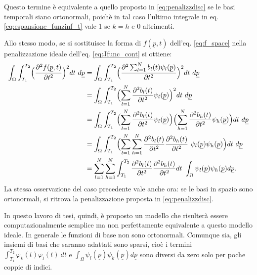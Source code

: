 \documentclass[a4paper,11pt,twoside,openright]{book}							%
\begin{document}
Questo termine è equivalente a quello proposto in \ref{eq:penalizzdisc} se le basi temporali siano ortonormali, poichè in tal caso l'ultimo integrale in eq. \ref{eq:espansione_funzinf_t} vale 1 se $k=h$ e 0 altrimenti.

Allo stesso modo, se si sostituisce la forma di $f(\underline p,t)$ dell'eq. \ref{eq:f_space} nella penalizzazione ideale dell'eq. \ref{eq:Jfunc_cont} si ottiene:
\begin{equation} 
\label{eq:espansione_funzinf_sp}
\begin{split}
\int_\Omega \int_{T_1}^{T_2} \Bigl( \frac{\partial^2 f(\underline p, t) }{\partial t ^2} \Bigr)^2 dt\ d\underline p 
&=\int_\Omega \int_{T_1}^{T_2} \Bigl( \frac{\partial^2 \sum_{l=1}^N b_l(t)\psi_l(\underline p) }{\partial t ^2} \Bigr)^2 dt\ d\underline p \\
&=\int_\Omega \int_{T_1}^{T_2} \Bigl( \sum_{l=1}^N \frac{ \partial^2b_l(t)}{\partial t ^2}\psi_l(\underline p)  \Bigr)^2 dt\ d\underline p  \\
&=\int_\Omega \int_{T_1}^{T_2} \Bigl( \sum_{l=1}^N \frac{ \partial^2b_l(t)}{\partial t ^2}\psi_l(\underline p)  \Bigr)\Bigl( \sum_{h=1}^N \frac{ \partial^2b_h(t)}{\partial t ^2}\psi_h(\underline p)  \Bigr) dt\ d\underline p \\
&= \int_\Omega \int_{T_1}^{T_2} \Bigl( \sum_{l=1}^N \sum_{h=1}^N \frac{ \partial^2b_l(t)}{\partial t ^2}\frac{ \partial^2b_h(t)}{\partial t ^2}\   \psi_l(\underline p)  \psi_h(\underline p)  \Bigr) dt\ d\underline p \\
&=\sum_{l=1}^N \sum_{h=1}^N  \int_{T_1}^{T_2}  \frac{ \partial^2b_l(t)}{\partial t ^2}\frac{ \partial^2b_h(t)}{\partial t ^2}dt\  \int_\Omega \psi_l(\underline p)  \psi_h(\underline p)    d\underline p .
\end{split}
\end{equation}
La stessa osservazione del caso precedente vale anche ora: se le basi in spazio sono ortonormali, si ritrova la penalizzazione proposta in \ref{eq:penalizzdisc}. 

In questo lavoro di tesi, quindi, è proposto un modello che risulterà essere computazionalmente semplice ma non perfettamente equivalente a questo modello ideale. In generale le funzioni di base non sono ortonormali. Comunque sia, gli insiemi di basi che saranno adattati sono sparsi, cioè i termini $ \int_{T_1}^{T_2} \varphi_k(t)\varphi_l(t)\ dt $ e $\int_\Omega \psi_l(\underline p)  \psi_k(\underline p)d\underline p$ sono diversi da zero solo per poche coppie di indici.
\end{document}
